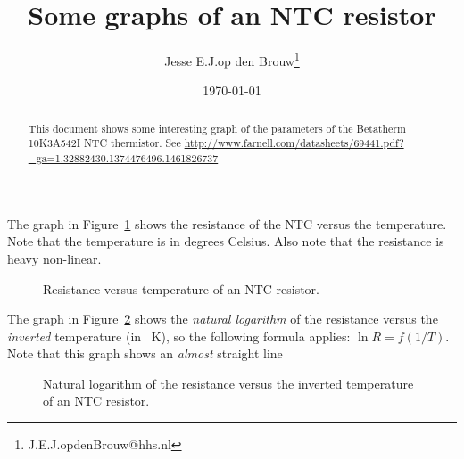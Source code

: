 \documentclass[a4paper]{article}
\author{Jesse E.\@ J.\@ op den Brouw\thanks{\sffamily J.E.J.opdenBrouw@hhs.nl}}
\title{Some graphs of an NTC resistor}
\date{\today}
\begin{document}
\maketitle
\vspace*{2cm}
\begin{abstract}
This document shows some interesting graph of the parameters of the Betatherm 10K3A542I NTC thermistor.
See \url{http://www.farnell.com/datasheets/69441.pdf?\_ga=1.32882430.1374476496.1461826737}
\end{abstract}
\newpage

The graph in Figure~\ref{fig1} shows the resistance of the NTC versus the temperature. Note that the temperature is in degrees Celsius. Also note that the resistance is heavy non-linear.

\begin{figure}[!ht]
\caption{Resistance versus temperature of an NTC resistor.}
\label{fig1}
\end{figure}

The graph in Figure~\ref{fig2} shows the \emph{natural logarithm} of the resistance versus the \emph{inverted} temperature (in \si{\per\kelvin}), so the following formula applies: $\ln R = f(1/T)$. Note that this graph shows an \emph{almost} straight line

\begin{figure}[!ht]
\caption{Natural logarithm of the resistance versus the inverted temperature of an NTC resistor.}
\label{fig2}
\end{figure}
\end{document}
